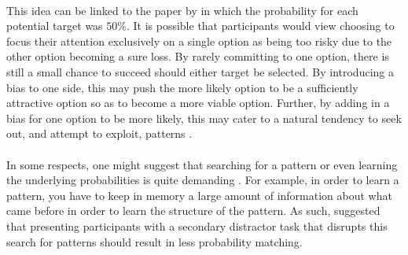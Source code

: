 \documentclass[12pt]{article}
\begin{document}
\paragraph{} This idea can be linked to the paper by \cite{clarke2015failure} in which the probability for each potential target was $50\%$. It is possible that participants would view choosing to focus their attention exclusively on a single option as being too risky due to the other option becoming a sure loss. By rarely committing to one option, there is still a small chance to succeed should either target be selected. By introducing a bias to one side, this may push the more likely option to be a sufficiently attractive option so as to become a more viable option. Further, by adding in a bias for one option to be more likely, this may cater to a natural tendency to seek out, and attempt to exploit, patterns \citep{gaissmaier2008smart,yellott1969probability}.

\paragraph{} In some respects, one might suggest that searching for a pattern \citep{wolford2004searching} or even learning the underlying probabilities is quite demanding \citep{kahneman1982judgement}. For example, in order to learn a pattern, you have to keep in memory a large amount of information about what came before in order to learn the structure of the pattern. As such, \cite{wolford2004searching} suggested that presenting participants with a secondary distractor task that disrupts this search for patterns should result in less probability matching. %
\end{document}
